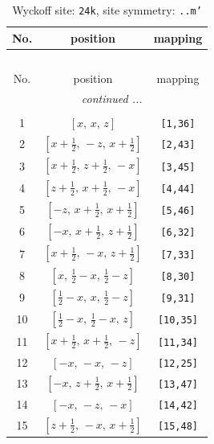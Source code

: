 \documentclass[fleqn,8pt]{jsarticle}
\begin{document}
\begin{longtable}{ccc}
\caption{Wyckoff site: {\tt 24k}, site symmetry: {\tt ..m'}}
 \\
 \hline \hline
No. & position & mapping \\ \hline \endfirsthead

\multicolumn{2}{l}{\tablename\ \thetable{}} \\
 \hline \hline
No. & position & mapping \\ \hline \endhead

 \hline \hline
\multicolumn{2}{r}{\footnotesize\it continued ...} \\ \endfoot

 \hline \hline
\multicolumn{2}{r}{} \\ \endlastfoot

1 & $\left[ x,\, x,\, z \right]$ & {\tt [1,36]} \\ \hline
2 & $\left[ x + \frac{1}{2},\, - z,\, x + \frac{1}{2} \right]$ & {\tt [2,43]} \\ \hline
3 & $\left[ x + \frac{1}{2},\, z + \frac{1}{2},\, - x \right]$ & {\tt [3,45]} \\ \hline
4 & $\left[ z + \frac{1}{2},\, x + \frac{1}{2},\, - x \right]$ & {\tt [4,44]} \\ \hline
5 & $\left[ - z,\, x + \frac{1}{2},\, x + \frac{1}{2} \right]$ & {\tt [5,46]} \\ \hline
6 & $\left[ - x,\, x + \frac{1}{2},\, z + \frac{1}{2} \right]$ & {\tt [6,32]} \\ \hline
7 & $\left[ x + \frac{1}{2},\, - x,\, z + \frac{1}{2} \right]$ & {\tt [7,33]} \\ \hline
8 & $\left[ x,\, \frac{1}{2} - x,\, \frac{1}{2} - z \right]$ & {\tt [8,30]} \\ \hline
9 & $\left[ \frac{1}{2} - x,\, x,\, \frac{1}{2} - z \right]$ & {\tt [9,31]} \\ \hline
10 & $\left[ \frac{1}{2} - x,\, \frac{1}{2} - x,\, z \right]$ & {\tt [10,35]} \\ \hline
11 & $\left[ x + \frac{1}{2},\, x + \frac{1}{2},\, - z \right]$ & {\tt [11,34]} \\ \hline
12 & $\left[ - x,\, - x,\, - z \right]$ & {\tt [12,25]} \\ \hline
13 & $\left[ - x,\, z + \frac{1}{2},\, x + \frac{1}{2} \right]$ & {\tt [13,47]} \\ \hline
14 & $\left[ - x,\, - z,\, - x \right]$ & {\tt [14,42]} \\ \hline
15 & $\left[ z + \frac{1}{2},\, - x,\, x + \frac{1}{2} \right]$ & {\tt [15,48]} \\ \hline

\end{longtable}
\end{document}

